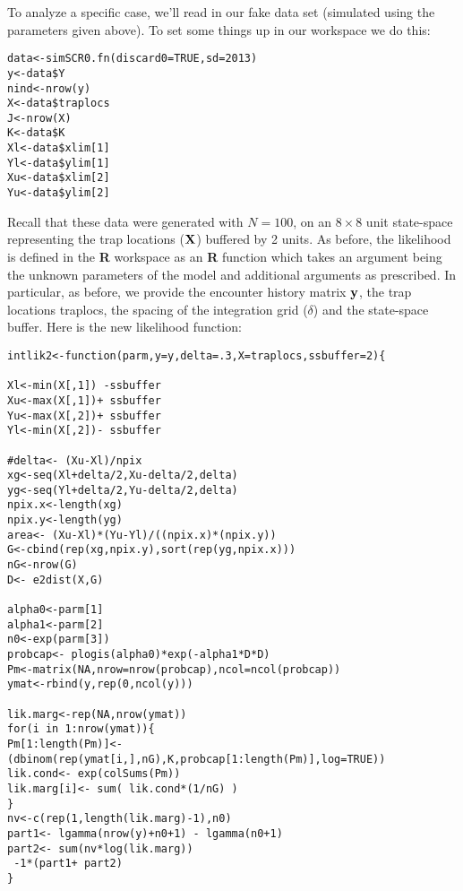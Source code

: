 To analyze a specific case, we’ll read in our fake data set (simulated
using the parameters given above). To set some things up in our
workspace we do this:

\begin{verbatim}
data<-simSCR0.fn(discard0=TRUE,sd=2013)
y<-data$Y
nind<-nrow(y)
X<-data$traplocs
J<-nrow(X)
K<-data$K
Xl<-data$xlim[1]
Yl<-data$ylim[1]
Xu<-data$xlim[2]
Yu<-data$ylim[2]

\end{verbatim}

Recall that these data were generated with $N=100$, on an $8 \times 8$ unit
state-space representing the trap locations (${\bf X}$) buffered by 2 units.
As before, the likelihood is defined in the {\bf R} workspace as an
{\bf R}
function which takes an argument being the unknown parameters of the
model and additional arguments as prescribed. In particular, as
before, we provide the encounter history matrix ${\bf y}$, the trap locations
traplocs, the spacing of the integration grid ($\delta$) and the
state-space buffer. Here is the new likelihood function:

\begin{verbatim}
intlik2<-function(parm,y=y,delta=.3,X=traplocs,ssbuffer=2){

Xl<-min(X[,1]) -ssbuffer
Xu<-max(X[,1])+ ssbuffer
Yu<-max(X[,2])+ ssbuffer
Yl<-min(X[,2])- ssbuffer

#delta<- (Xu-Xl)/npix
xg<-seq(Xl+delta/2,Xu-delta/2,delta) 
yg<-seq(Yl+delta/2,Yu-delta/2,delta) 
npix.x<-length(xg)
npix.y<-length(yg)
area<- (Xu-Xl)*(Yu-Yl)/((npix.x)*(npix.y))
G<-cbind(rep(xg,npix.y),sort(rep(yg,npix.x)))
nG<-nrow(G)
D<- e2dist(X,G) 

alpha0<-parm[1]
alpha1<-parm[2]
n0<-exp(parm[3])
probcap<- plogis(alpha0)*exp(-alpha1*D*D)
Pm<-matrix(NA,nrow=nrow(probcap),ncol=ncol(probcap))
ymat<-rbind(y,rep(0,ncol(y)))

lik.marg<-rep(NA,nrow(ymat))
for(i in 1:nrow(ymat)){
Pm[1:length(Pm)]<- (dbinom(rep(ymat[i,],nG),K,probcap[1:length(Pm)],log=TRUE))
lik.cond<- exp(colSums(Pm))
lik.marg[i]<- sum( lik.cond*(1/nG) )  
}                                                 
nv<-c(rep(1,length(lik.marg)-1),n0)
part1<- lgamma(nrow(y)+n0+1) - lgamma(n0+1)
part2<- sum(nv*log(lik.marg))
 -1*(part1+ part2)
}
\end{verbatim}

